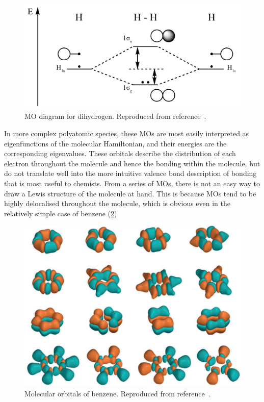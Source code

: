 \begin{refsection}
\begin{figure}
    \includegraphics[width=0.6\linewidth]{Figures/h-orbital-diagram.pdf}
    \caption{MO diagram for dihydrogen. Reproduced from reference~\cite{h-orbital-diagram}.}\label{fig:h-orbital-diagram}
\end{figure}

In more complex polyatomic species, these MOs are most easily interpreted as eigenfunctions of the molecular Hamiltonian, and their energies are the corresponding eigenvalues. 
These orbitals describe the distribution of each electron throughout the molecule and hence the bonding within the molecule, but do not translate well into the more intuitive valence bond description of bonding that is most useful to chemists.
From a series of MOs, there is not an easy way to draw a Lewis structure of the molecule at hand.
This is because MOs tend to be highly delocalised throughout the molecule, which is obvious even in the relatively simple case of benzene (\cref{fig:benzene-mo}).

\begin{figure}
    \includegraphics[width=0.8\linewidth]{Figures/benzene-mo.pdf}
    \caption{Molecular orbitals of benzene. Reproduced from reference~\cite{Luhmann2015}.}\label{fig:benzene-mo}
\end{figure}


\end{refsection}
